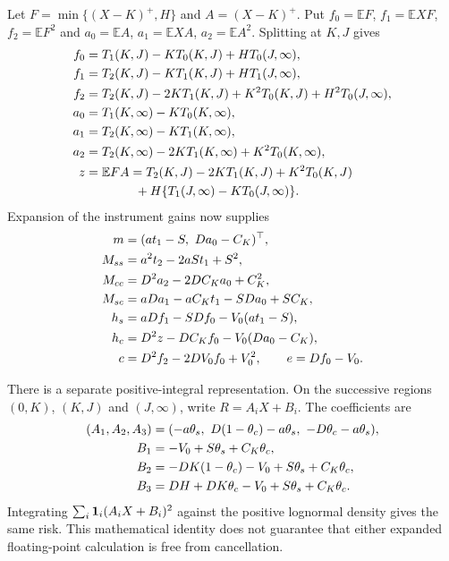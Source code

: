\documentclass[11pt]{article}
\begin{document}
Let $F=\min\{(X-K)^+,H\}$ and $A=(X-K)^+$. Put
$f_0=\mathbb EF$, $f_1=\mathbb EXF$, $f_2=\mathbb EF^2$ and
$a_0=\mathbb EA$, $a_1=\mathbb EXA$, $a_2=\mathbb EA^2$.
Splitting at $K,J$ gives
\begin{align}
 f_0&=T_1(K,J)-KT_0(K,J)+HT_0(J,\infty),\notag\\
 f_1&=T_2(K,J)-KT_1(K,J)+HT_1(J,\infty),\notag\\
 f_2&=T_2(K,J)-2KT_1(K,J)+K^2T_0(K,J)+H^2T_0(J,\infty),
 \label{eq:h-capped-moments}\\
 a_0&=T_1(K,\infty)-KT_0(K,\infty),\notag\\
 a_1&=T_2(K,\infty)-KT_1(K,\infty),\notag\\
 a_2&=T_2(K,\infty)-2KT_1(K,\infty)+K^2T_0(K,\infty),
 \label{eq:h-call-moments}\\
 z&=\mathbb EFA=T_2(K,J)-2KT_1(K,J)+K^2T_0(K,J)\notag\\
 &\hspace{14mm}+H\{T_1(J,\infty)-KT_0(J,\infty)\}.
 \label{eq:h-payoff-cross-moment}
\end{align}
Expansion of the instrument gains now supplies
\begin{align}
 m&=(at_1-S,\ Da_0-C_K)^\top,\notag\\
 M_{ss}&=a^2t_2-2aSt_1+S^2,\notag\\
 M_{cc}&=D^2a_2-2DC_Ka_0+C_K^2,\notag\\
 M_{sc}&=aDa_1-aC_Kt_1-SDa_0+SC_K,\label{eq:h-gain-moments}\\
 h_s&=aDf_1-SDf_0-V_0(at_1-S),\notag\\
 h_c&=D^2z-DC_Kf_0-V_0(Da_0-C_K),\notag\\
 c&=D^2f_2-2DV_0f_0+V_0^2,\qquad e=Df_0-V_0.
 \label{eq:h-loss-moments}
\end{align}

There is a separate positive-integral representation. On the successive
regions $(0,K)$, $(K,J)$ and $(J,\infty)$, write $R=A_iX+B_i$.
The coefficients are
\begin{align}
 (A_1,A_2,A_3)&=(-a\theta_s,\ D(1-\theta_c)-a\theta_s,\
 -D\theta_c-a\theta_s),\notag\\
 B_1&=-V_0+S\theta_s+C_K\theta_c,\notag\\
 B_2&=-DK(1-\theta_c)-V_0+S\theta_s+C_K\theta_c,\notag\\
 B_3&=DH+DK\theta_c-V_0+S\theta_s+C_K\theta_c.
 \label{eq:h-affine-residual}
\end{align}
Integrating $\sum_i{\bf1}_i(A_iX+B_i)^2$ against the positive
lognormal density gives the same risk. This mathematical identity
does not guarantee that either expanded floating-point calculation
is free from cancellation.
\end{document}
